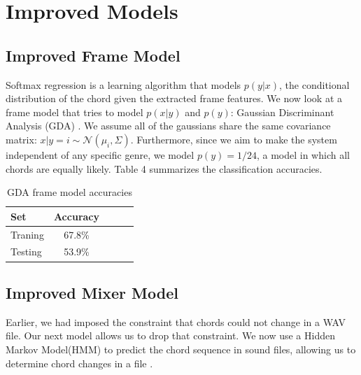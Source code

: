 \documentclass{article}
\begin{document}
\section{Improved Models}
\subsection{Improved Frame Model}

Softmax regression is a learning algorithm that models $p(y|x)$, the conditional
distribution of the chord given the extracted frame features. We now look at a frame
model that tries to model $p(x|y)$ and $p(y)$: Gaussian Discriminant Analysis
(GDA) \cite{jiang}. We assume all of the gaussians share
the same covariance matrix: $x|y=i \sim \mathcal{N}$$(\mu_i, \Sigma)$. Furthermore, since we aim to make the system independent of any specific genre, we model $p(y) =
1/24$, a model in which all chords are equally likely. Table 4 summarizes the classification accuracies.

\begin{table}[t]
\caption{GDA frame model accuracies}
\label{mfccvschroma}
\vskip 0.15in
\begin{center}
\begin{small}
\begin{sc}
\begin{tabular}{lcccr}
\hline
\abovespace\belowspace
Set & Accuracy \\
\hline
\abovespace
Traning & 67.8\%\\
Testing & 53.9\%\\
\hline
\end{tabular}
\end{sc}
\end{small}
\end{center}
\vskip -0.1in
\end{table}


\subsection{Improved Mixer Model}
Earlier, we had imposed the constraint that chords could not change in a WAV
file. Our next model allows us to drop that constraint. We now use a Hidden
Markov Model(HMM) to predict the chord sequence in sound files, allowing us to
determine chord changes in a file \cite{sheh}.
\end{document}
